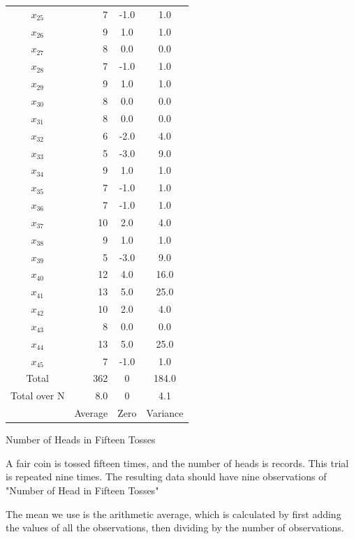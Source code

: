 \documentclass[nohyper,justified]{tufte-handout}\usepackage[]{graphicx}\usepackage[]{color}
\begin{document}
\begin{margintable}
\begin{tabular}{cr|c|c|}
  $x_{25}$ & 7 & -1.0 & 1.0 \\ 
   \rowcolor[gray]{0.95}$x_{26}$ & 9 & 1.0 & 1.0 \\ 
  $x_{27}$ & 8 & 0.0 & 0.0 \\ 
   \rowcolor[gray]{0.95}$x_{28}$ & 7 & -1.0 & 1.0 \\ 
  $x_{29}$ & 9 & 1.0 & 1.0 \\ 
   \rowcolor[gray]{0.95}$x_{30}$ & 8 & 0.0 & 0.0 \\ 
  $x_{31}$ & 8 & 0.0 & 0.0 \\ 
   \rowcolor[gray]{0.95}$x_{32}$ & 6 & -2.0 & 4.0 \\ 
  $x_{33}$ & 5 & -3.0 & 9.0 \\ 
   \rowcolor[gray]{0.95}$x_{34}$ & 9 & 1.0 & 1.0 \\ 
  $x_{35}$ & 7 & -1.0 & 1.0 \\ 
   \rowcolor[gray]{0.95}$x_{36}$ & 7 & -1.0 & 1.0 \\ 
  $x_{37}$ & 10 & 2.0 & 4.0 \\ 
   \rowcolor[gray]{0.95}$x_{38}$ & 9 & 1.0 & 1.0 \\ 
  $x_{39}$ & 5 & -3.0 & 9.0 \\ 
   \rowcolor[gray]{0.95}$x_{40}$ & 12 & 4.0 & 16.0 \\ 
  $x_{41}$ & 13 & 5.0 & 25.0 \\ 
   \rowcolor[gray]{0.95}$x_{42}$ & 10 & 2.0 & 4.0 \\ 
  $x_{43}$ & 8 & 0.0 & 0.0 \\ 
   \rowcolor[gray]{0.95}$x_{44}$ & 13 & 5.0 & 25.0 \\ 
  $x_{45}$ & 7 & -1.0 & 1.0 \\ 
   \bottomrule
Total & 362 & 0 & 184.0 \\ 
\rowcolor[gray]{0.95}Total over N &   8.0 & 0 &   4.1 \\ 
 & Average & Zero & Variance \\
\end{tabular}
\caption{Number of Heads in Fifteen Tosses} 
\end{margintable}


A fair coin is tossed fifteen times, and the number of heads is records. This trial is repeated nine times. The resulting data should have nine observations of "Number of Head in Fifteen Tosses"

The mean we use is the arithmetic average, which is calculated by first adding the values of all the observations, then dividing by the number of observations.
\end{document}
